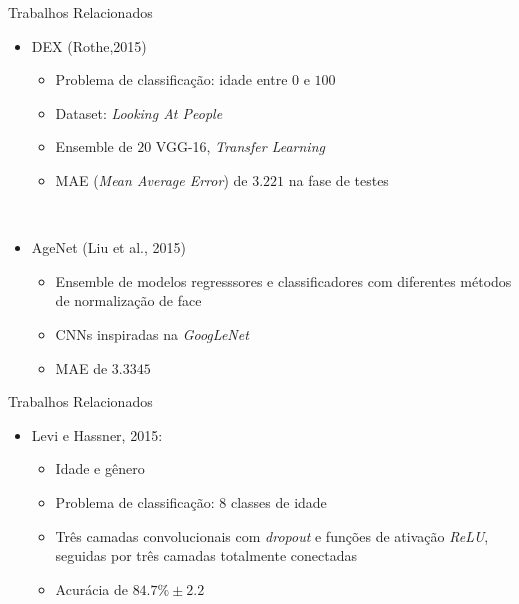 \begin{frame}{Trabalhos Relacionados}
\begin{itemize}
  \item \alert{DEX} (Rothe,2015)
  \begin{itemize}
    \item Problema de classificação: idade entre $0$ e $100$
    \item Dataset: \emph{Looking At People}
    \item Ensemble de $20$ VGG-16, \emph{Transfer Learning}
    \item MAE (\emph{Mean Average Error}) de $3.221$ na fase de testes
  \end{itemize}
  \ \ \newline \pause
  \item \alert{AgeNet} (Liu et al., 2015)
  \begin{itemize}
    \item Ensemble de modelos regresssores e classificadores com diferentes métodos de normalização de face
    \item CNNs inspiradas na \emph{GoogLeNet}
    \item MAE de $3.3345$
  \end{itemize}
  \end{itemize}
\end{frame}


\begin{frame}{Trabalhos Relacionados}
\begin{itemize}
  \item \alert{Levi e Hassner, 2015}:
  \begin{itemize}
    \item Idade e gênero
    \item Problema de classificação: 8 classes de idade
    \item Três camadas convolucionais com \emph{dropout} e funções de ativação \emph{ReLU}, seguidas por três camadas totalmente conectadas
    \item Acurácia de $84.7\% \pm 2.2$
  \end{itemize}
\end{itemize}
\end{frame}

